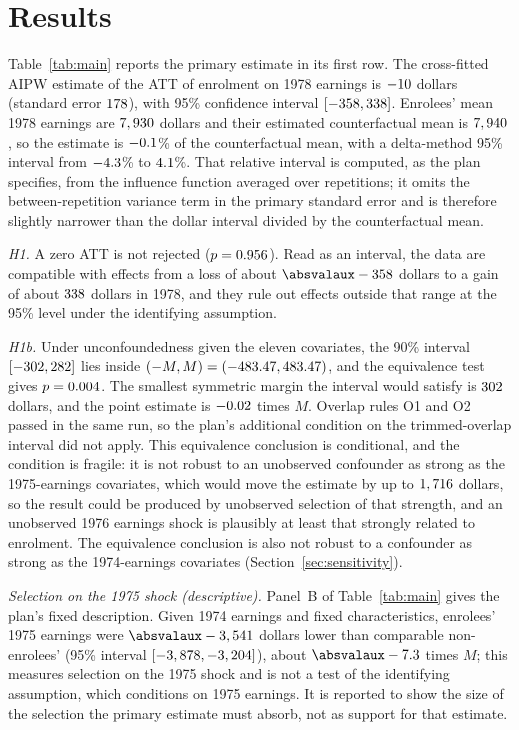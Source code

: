 \documentclass[11pt]{article}
\def\absvalaux-#1\relax{#1}
\newcommand{\absval}[1]{\expandafter\absvalaux#1\relax}
\newcommand{\ci}[2]{$[#1, #2]$}
\begin{document}
\section{Results}
\label{sec:results}

Table~\ref{tab:main} reports the primary estimate in its first row. The cross-fitted AIPW
estimate of the ATT of enrolment on 1978 earnings is $-10$ dollars (standard
error $178$), with 95\% confidence interval \ci{\PrimaryCILow}{\PrimaryCIHigh}.
Enrolees' mean 1978 earnings are $7,930$ dollars and their estimated
counterfactual mean is $7,940$, so the estimate is $-0.1$\% of the
counterfactual mean, with a delta-method 95\% interval from $-4.3$\% to
$4.1$\%. That relative interval is computed, as the plan specifies, from the
influence function averaged over repetitions; it omits the between-repetition variance term
in the primary standard error and is therefore slightly narrower than the dollar interval
divided by the counterfactual mean.

\emph{H1.} A zero ATT is not rejected ($p = 0.956$). Read as an interval, the data are
compatible with effects from a loss of about $\absval{\PrimaryCILow}$ dollars to a gain of
about $338$ dollars in 1978, and they rule out effects outside that range at the
95\% level under the identifying assumption.

\emph{H1b.} Under unconfoundedness given the eleven covariates, the 90\% interval
\ci{\PrimaryCINinetyLow}{\PrimaryCINinetyHigh} lies inside $(-M, M) =
(-483.47, 483.47)$, and the equivalence test gives $p = 0.004$. The
smallest symmetric margin the interval would satisfy is $302$ dollars, and the
point estimate is $-0.02$ times $M$. Overlap rules O1 and O2 passed in
the same run, so the plan's additional condition on the trimmed-overlap interval did not
apply. This equivalence conclusion is conditional, and the condition is fragile: it is not
robust to an unobserved confounder as strong as the 1975-earnings covariates, which would move
the estimate by up to $1,716$ dollars, so the result could be
produced by unobserved selection of that strength, and an unobserved 1976 earnings shock is
plausibly at least that strongly related to enrolment. The equivalence conclusion is also not
robust to a confounder as strong as the 1974-earnings covariates
(Section~\ref{sec:sensitivity}).

\emph{Selection on the 1975 shock (descriptive).} Panel~B of Table~\ref{tab:main} gives the
plan's fixed description. Given 1974 earnings and fixed characteristics, enrolees' 1975
earnings were $\absval{\SelectEarnPriorEffect}$ dollars lower than comparable non-enrolees'
(95\% interval \ci{\SelectEarnPriorCILow}{\SelectEarnPriorCIHigh}), about
$\absval{\SelectEarnPriorOverMargin}$ times $M$; this measures selection on the 1975 shock
and is not a test of the identifying assumption, which conditions on 1975 earnings. It is
reported to show the size of the selection the primary estimate must absorb, not as support
for that estimate.
\end{document}
